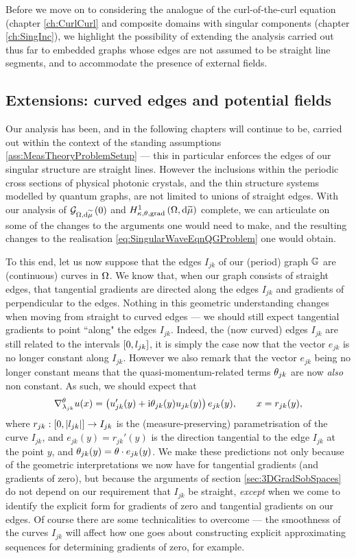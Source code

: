 Before we move on to considering the analogue of the curl-of-the-curl equation (chapter \ref{ch:CurlCurl} and composite domains with singular components (chapter \ref{ch:SingInc}), we highlight the possibility of extending the analysis carried out thus far to embedded graphs whose edges are not assumed to be straight line segments, and to accommodate the presence of external fields.

\subsection{Extensions: curved edges and potential fields} \label{ssec:CurvedEdges}
Our analysis has been, and in the following chapters will continue to be, carried out within the context of the standing assumptions \ref{ass:MeasTheoryProblemSetup} --- this in particular enforces the edges of our singular structure are straight lines.
However the inclusions within the periodic cross sections of physical photonic crystals, and the thin structure systems modelled by quantum graphs, are not limited to unions of straight edges.
With our analysis of $\mathcal{G}_{ \Omega, \mathrm{d}\widetilde{\mu}}\left( 0 \right)$ and $H^1_{\kappa,\theta,\mathrm{grad}}\left( \Omega, \mathrm{d}\widetilde{\mu} \right)$ complete, we can articulate on some of the changes to the arguments one would need to make, and the resulting changes to the realisation \eqref{eq:SingularWaveEqnQGProblem} one would obtain.

To this end, let us now suppose that the edges $I_{jk}$ of our (period) graph $\mathbb{G}$ are (continuous) curves in $\Omega$.
We know that, when our graph consists of straight edges, that tangential gradients are directed along the edges $I_{jk}$ and gradients of perpendicular to the edges.
Nothing in this geometric understanding changes when moving from straight to curved edges --- we should still expect tangential gradients to point ``along" the edges $I_{jk}$.
Indeed, the (now curved) edges $I_{jk}$ are still related to the intervals $\left[ 0,l_{jk} \right]$, it is simply the case now that the vector $e_{jk}$ is no longer constant along $I_{jk}$.
However we also remark that the vector $e_{jk}$ being no longer constant means that the quasi-momentum-related terms $\theta_{jk}$ are now \emph{also} non constant.
As such, we should expect that
\begin{align*}
	\nabla^{\theta}_{\lambda_{jk}}u(x) = \left(  u_{jk}'(y) + \mathrm{i}\theta_{jk}(y) u_{jk}(y) \right)e_{jk}(y),
	\qquad x = r_{jk}(y),
\end{align*}
where $r_{jk}:\left[ 0,\left\lvert l_{jk} \right\rvert \right]\rightarrow I_{jk}$ is the (measure-preserving) parametrisation of the curve $I_{jk}$, and $e_{jk}(y) = r_{jk}'(y)$ is the direction tangential to the edge $I_{jk}$ at the point $y$, and $\theta_{jk}(y)=\theta\cdot e_{jk}(y)$.
We make these predictions not only because of the geometric interpretations we now have for tangential gradients (and gradients of zero), but because the arguments of section \ref{sec:3DGradSobSpaces} do not depend on our requirement that $I_{jk}$ be straight, \emph{except} when we come to identify the explicit form for gradients of zero and tangential gradients on our edges.
Of course there are some technicalities to overcome --- the smoothness of the curves $I_{jk}$ will affect how one goes about constructing explicit approximating sequences for determining gradients of zero, for example.

